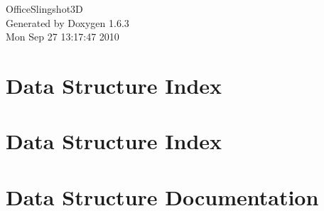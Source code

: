 \documentclass[a4paper]{book}
\begin{document}
\hypersetup{pageanchor=false}
\begin{titlepage}
\vspace*{7cm}
\begin{center}
{\Large OfficeSlingshot3D }\\
\vspace*{1cm}
{\large Generated by Doxygen 1.6.3}\\
\vspace*{0.5cm}
{\small Mon Sep 27 13:17:47 2010}\\
\end{center}
\end{titlepage}
\clearemptydoublepage
{}
\tableofcontents
\clearemptydoublepage
{}
\hypersetup{pageanchor=true}
\chapter{Data Structure Index}

\chapter{Data Structure Index}

\chapter{Data Structure Documentation}



























































\printindex
\end{document}
